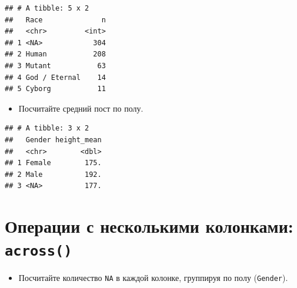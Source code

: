\documentclass[]{book}
\newenvironment{Shaded}{\begin{snugshade}}{\end{snugshade}}
\newcommand{\KeywordTok}[1]{\textcolor[rgb]{0.13,0.29,0.53}{\textbf{#1}}}
\newcommand{\DataTypeTok}[1]{\textcolor[rgb]{0.13,0.29,0.53}{#1}}
\newcommand{\StringTok}[1]{\textcolor[rgb]{0.31,0.60,0.02}{#1}}
\newcommand{\OtherTok}[1]{\textcolor[rgb]{0.56,0.35,0.01}{#1}}
\newcommand{\ControlFlowTok}[1]{\textcolor[rgb]{0.13,0.29,0.53}{\textbf{#1}}}
\newcommand{\OperatorTok}[1]{\textcolor[rgb]{0.81,0.36,0.00}{\textbf{#1}}}
\newcommand{\NormalTok}[1]{#1}
\providecommand{\tightlist}{%
  \setlength{\itemsep}{0pt}\setlength{\parskip}{0pt}}
\begin{document}
\begin{verbatim}
## # A tibble: 5 x 2
##   Race              n
##   <chr>         <int>
## 1 <NA>            304
## 2 Human           208
## 3 Mutant           63
## 4 God / Eternal    14
## 5 Cyborg           11
\end{verbatim}

\begin{itemize}
\tightlist
\item
  Посчитайте средний пост по полу.
\end{itemize}

\begin{Shaded}
\end{Shaded}

\begin{verbatim}
## # A tibble: 3 x 2
##   Gender height_mean
##   <chr>        <dbl>
## 1 Female        175.
## 2 Male          192.
## 3 <NA>          177.
\end{verbatim}

\section{\texorpdfstring{Операции с несколькими колонками:
\texttt{across()}}{Операции с несколькими колонками: across()}}\label{solution_across}

\begin{itemize}
\tightlist
\item
  Посчитайте количество \texttt{NA} в каждой колонке, группируя по полу
  (\texttt{Gender}).
\end{itemize}

\begin{Shaded}
\end{Shaded}
\end{document}
